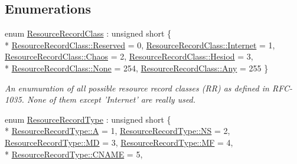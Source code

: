 \subsection*{Enumerations}
\begin{DoxyCompactItemize}
\item 
enum \hyperlink{namespace_senergy_1_1_dns_a953f153bc411213d621d00c1e1b3eb9d}{Resource\-Record\-Class} \-: unsigned short \{ \\*
\hyperlink{namespace_senergy_1_1_dns_a953f153bc411213d621d00c1e1b3eb9da942d4e37dd5607ab68e54755540d4a47}{Resource\-Record\-Class\-::\-Reserved} = 0, 
\hyperlink{namespace_senergy_1_1_dns_a953f153bc411213d621d00c1e1b3eb9dac8205c7636e728d448c2774e6a4a944b}{Resource\-Record\-Class\-::\-Internet} = 1, 
\hyperlink{namespace_senergy_1_1_dns_a953f153bc411213d621d00c1e1b3eb9da7e8214916782021125d0afd9d9d9ee66}{Resource\-Record\-Class\-::\-Chaos} = 2, 
\hyperlink{namespace_senergy_1_1_dns_a953f153bc411213d621d00c1e1b3eb9da04e26d2a6e2432efc191fd0b9d9f0c9c}{Resource\-Record\-Class\-::\-Hesiod} = 3, 
\\*
\hyperlink{namespace_senergy_1_1_dns_a953f153bc411213d621d00c1e1b3eb9da6adf97f83acf6453d4a6a4b1070f3754}{Resource\-Record\-Class\-::\-None} = 254, 
\hyperlink{namespace_senergy_1_1_dns_a953f153bc411213d621d00c1e1b3eb9daed36a1ef76a59ee3f15180e0441188ad}{Resource\-Record\-Class\-::\-Any} = 255
 \}
\begin{DoxyCompactList}\small\item\em An enumuration of all possible resource record classes (R\-R) as defined in R\-F\-C-\/1035. None of them except 'Internet' are really used. \end{DoxyCompactList}\item 
enum \hyperlink{namespace_senergy_1_1_dns_a590bfd748c955364770f5ce358d9dfe0}{Resource\-Record\-Type} \-: unsigned short \{ \\*
\hyperlink{namespace_senergy_1_1_dns_a590bfd748c955364770f5ce358d9dfe0a7fc56270e7a70fa81a5935b72eacbe29}{Resource\-Record\-Type\-::\-A} = 1, 
\hyperlink{namespace_senergy_1_1_dns_a590bfd748c955364770f5ce358d9dfe0a53c8d15a175221d2127083e66a8cc937}{Resource\-Record\-Type\-::\-N\-S} = 2, 
\hyperlink{namespace_senergy_1_1_dns_a590bfd748c955364770f5ce358d9dfe0a7dc10e66da5549d351765bd940b81be9}{Resource\-Record\-Type\-::\-M\-D} = 3, 
\hyperlink{namespace_senergy_1_1_dns_a590bfd748c955364770f5ce358d9dfe0a12c578c9f48dd6727464670d5daa0f9c}{Resource\-Record\-Type\-::\-M\-F} = 4, 
\\*
\hyperlink{namespace_senergy_1_1_dns_a590bfd748c955364770f5ce358d9dfe0aadc4bfdb0829dae99e3699393e3fbaa4}{Resource\-Record\-Type\-::\-C\-N\-A\-M\-E} = 5, 

\end{DoxyCompactItemize}
